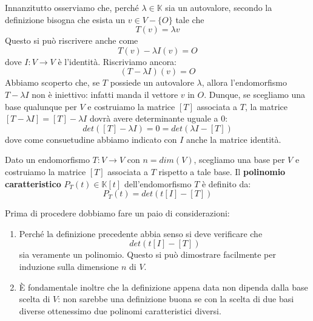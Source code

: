 Innanzitutto osserviamo che, perch\'e $\lambda \in \mathbb{K}$ sia un
autovalore, secondo la definizione bisogna che esista un $v \in V - \{O\}$
tale che
\begin{equation*}
	T(v) = \lambda v
\end{equation*}
Questo si pu\`o riscrivere anche come
\begin{equation*}
	T(v) - \lambda I(v) = O
\end{equation*}
dove $I : V \to V$ \`e l'identit\`a. Riscriviamo ancora:
\begin{equation*}
	(T - \lambda I)(v) = O
\end{equation*}
Abbiamo scoperto che, se $T$ possiede un autovalore $\lambda$, allora
l'endomorfismo $T - \lambda I$ non \`e iniettivo: infatti manda il vettore
$v$ in $O$. Dunque, se scegliamo una base qualunque per $V$ e costruiamo la
matrice $[T]$ associata a $T$, la matrice $[T - \lambda I] = [T] - \lambda I$
dovr\`a avere determinante uguale a 0:
\begin{equation*}
	det([T] - \lambda I) = 0 = det(\lambda I - [T])
\end{equation*}
dove come consuetudine abbiamo indicato con $I$ anche la matrice identit\`a.

\begin{defn}
	Dato un endomorfismo $T : V \to V$ con $n = dim(V)$, scegliamo una base
	per $V$ e costruiamo la matrice $[T]$ associata a $T$ rispetto a tale
	base. Il \textbf{polinomio caratteristico} $P_T(t) \in \mathbb{K}[t]$
	dell'endomorfismo $T$ \`e definito da:
	\begin{equation*}
		P_T(t) = det(t[I] - [T])
	\end{equation*}
\end{defn}

\begin{observation}
	Prima di procedere dobbiamo fare un paio di considerazioni:
	\begin{enumerate}
		\item Perch\'e la definizione precedente abbia senso si deve verificare
		      che \[det(t[I] - [T])\] sia veramente un polinomio. Questo si pu\`o
		      dimostrare facilmente per induzione sulla dimensione
		      $n$ di $V$.
		\item \`E fondamentale inoltre che la definizione appena data non dipenda
		      dalla base scelta di $V$: non sarebbe una definizione buona se con
		      la scelta di due basi diverse ottenessimo due polinomi
		      caratteristici diversi.
	\end{enumerate}
\end{observation}

